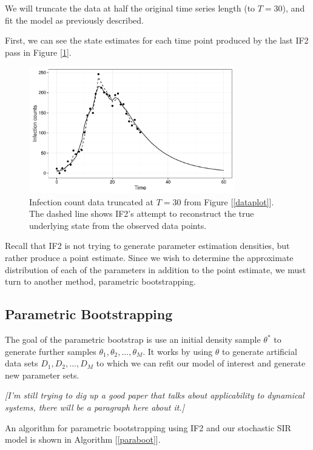 	We will truncate the data at half the original time series length (to $T = 30$), and fit the model as previously described.

	First, we can see the state estimates for each time point produced by the last IF2 pass in Figure [\ref{if2fit}].

	\begin{figure}
        \centering
        \captionsetup{width=.8\linewidth}
        \includegraphics[width=0.8\textwidth]{./images/if2fit.pdf}
        \caption{Infection count data truncated at $T = 30$ from Figure [\ref{dataplot}]. The dashed line shows IF2's attempt to reconstruct the true underlying state from the observed data points. \label{if2fit}}
    \end{figure}

    Recall that IF2 is not trying to generate parameter estimation densities, but rather produce a point estimate. Since we wish to determine the approximate distribution of each of the parameters in addition to the point estimate, we must turn to another method, parametric bootstrapping.


\subsection{Parametric Bootstrapping}

	The goal of the parametric bootstrap is use an initial density sample $\theta^*$ to generate further samples $\theta_1, \theta_2, ..., \theta_M$. It works by using $\theta$ to generate artificial data sets $D_1, D_2, ..., D_M$ to which we can refit our model of interest and generate new parameter sets.

	\textit{[I'm still trying to dig up a good paper that talks about applicability to dynamical systems, there will be a paragraph here about it.]}

	An algorithm for parametric bootstrapping using IF2 and our stochastic SIR model is shown in Algorithm [\ref{paraboot}].


